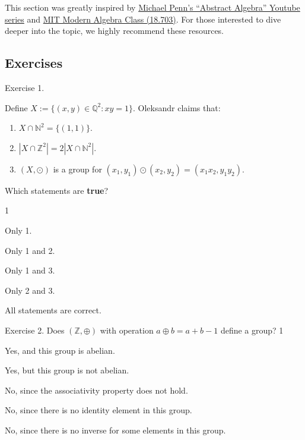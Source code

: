 \documentclass[../../book.tex]{subfiles}
\begin{document}
This section was greatly inspired by
\href{https://www.youtube.com/watch?v=j5nkkCp0ARw&list=PLVMgvCDIRy1y4JFpnpzEQZ0gRwr-sPTpw}{Michael
Penn's ``Abstract Algebra'' Youtube series} and
\href{https://ocw.mit.edu/courses/18-703-modern-algebra-spring-2013/}{MIT Modern
Algebra Class (18.703)}. For those interested to dive deeper into the topic, we
highly recommend these resources.

\subsection{Exercises}

\begin{xexercise}
    {Exercise 1.}
    {Define $X := \{(x,y) \in \mathbb{Q}^2: xy=1\}$. Oleksandr claims that:
    \begin{enumerate}
        \item $X \cap \mathbb{N}^2 = \{(1,1)\}$.
        \item $|X \cap \mathbb{Z}^2| = 2|X \cap \mathbb{N}^2|$.
        \item $(X,\odot)$ is a group for $(x_1,y_1)\odot (x_2,y_2) = (x_1x_2,y_1y_2)$.
    \end{enumerate}
    Which statements are \textbf{true}?
    }
    {1}
    {
        \item Only 1.
        \item Only 1 and 2.
        \item Only 1 and 3.
        \item Only 2 and 3.
        \item All statements are correct.
    }
\end{xexercise}

\begin{xexercise}
    {Exercise 2.}
    {Does $(\mathbb{Z},\oplus)$ with operation $a \oplus b = a + b - 1$ define a group?}
    {1}
    {
        \item Yes, and this group is abelian.
        \item Yes, but this group is not abelian.
        \item No, since the associativity property does not hold.
        \item No, since there is no identity element in this group.
        \item No, since there is no inverse for some elements in this group.
    }
\end{xexercise}
\end{document}
